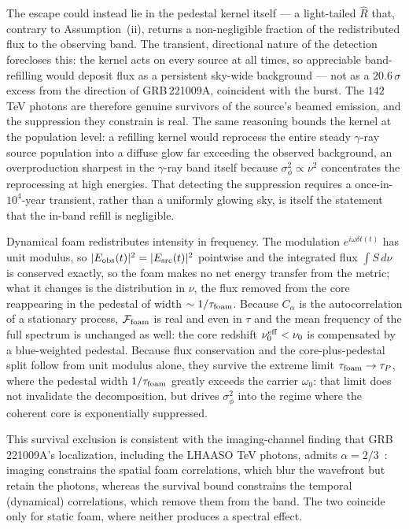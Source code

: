 \documentclass[aps,prd,onecolumn,amsmath,amssymb]{revtex4-2}
\begin{document}
The escape could instead lie in the pedestal kernel itself --- a
light-tailed $\hat{R}$ that, contrary to Assumption~(ii), returns a
non-negligible fraction of the redistributed flux to the observing band.
The transient, directional nature of the detection forecloses this: the
kernel acts on every source at all times, so appreciable band-refilling
would deposit flux as a persistent sky-wide background --- not as a
$20.6\,\sigma$ excess from the direction of GRB\,221009A, coincident
with the burst.
The $142$ TeV photons are therefore genuine survivors of the source's
beamed emission, and the suppression they constrain is real.  The same
reasoning bounds the kernel at the population level: a refilling kernel
would reprocess the entire steady $\gamma$-ray source population into a
diffuse glow far exceeding the observed background, an overproduction
sharpest in the $\gamma$-ray band itself because
$\sigma_\phi^2\propto\nu^2$ concentrates the reprocessing at high
energies.  That detecting the suppression requires a
once-in-$10^4$-year transient, rather than a uniformly glowing sky, is
itself the statement that the in-band refill is negligible.

Dynamical foam redistributes intensity in frequency.  The
modulation $e^{i\omega\delta t(t)}$ has unit modulus, so $|E_{\rm obs}(t)|^2
= |E_{\rm src}(t)|^2$ pointwise and the integrated flux $\int S\,d\nu$ is
conserved exactly, so the foam makes no net energy transfer from the metric;
what it changes is the distribution in $\nu$, the flux removed from the core
reappearing in the pedestal of width $\sim1/\tau_{\rm foam}$.  Because
$C_\alpha$ is the autocorrelation of a stationary process,
$\mathcal{F}_{\rm foam}$ is real and even in $\tau$ and the mean frequency of
the full spectrum is unchanged as well: the core redshift
$\nu_0^{\rm eff}<\nu_0$ is compensated by a blue-weighted pedestal.  Because flux conservation and the core-plus-pedestal split
follow from unit modulus alone, they survive the extreme limit
$\tau_{\rm foam}\to\tau_P$, where the pedestal width $1/\tau_{\rm foam}$
greatly exceeds the carrier $\omega_0$: that limit does not invalidate the
decomposition, but drives $\sigma_\phi^2$ into the regime where the
coherent core is exponentially suppressed.

This survival exclusion is consistent with the imaging-channel finding
that GRB\,221009A's localization, including the LHAASO TeV photons, admits
$\alpha=2/3$~\cite{SteinbringNg2026}: imaging constrains the spatial
foam correlations, which blur the wavefront but retain the photons, whereas
the survival bound constrains the temporal (dynamical) correlations,
which remove them from the band.  The two coincide only for static foam,
where neither produces a spectral effect.
\end{document}
